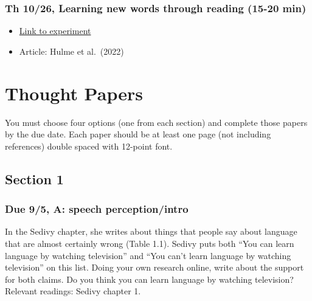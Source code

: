 \documentclass[
  letterpaper,
  DIV=11,
  numbers=noendperiod]{scrreprt}
\providecommand{\tightlist}{%
  \setlength{\itemsep}{0pt}\setlength{\parskip}{0pt}}\usepackage{longtable,booktabs,array}
\begin{document}
\hypertarget{th-1026-learning-new-words-through-reading-15-20-min}{%
\subsection*{Th 10/26, Learning new words through reading (15-20
min)}\label{th-1026-learning-new-words-through-reading-15-20-min}}

\begin{itemize}
\tightlist
\item
  \href{https://research.sc/participant/login/dynamic/B3E7A61D-6F92-4B3A-B80A-8D8513D01C6B}{Link
  to experiment}
\item
  Article: Hulme et al.~(2022)
\end{itemize}

\hypertarget{thought-papers}{%
\chapter*{Thought Papers}\label{thought-papers}}


You must choose four options (one from each section) and complete those
papers by the due date. Each paper should be at least one page (not
including references) double spaced with 12-point font.

\hypertarget{section-1}{%
\section*{Section 1}\label{section-1}}


\hypertarget{due-95-a-speech-perceptionintro}{%
\subsection*{Due 9/5, A: speech
perception/intro}\label{due-95-a-speech-perceptionintro}}

In the Sedivy chapter, she writes about things that people say about
language that are almost certainly wrong (Table 1.1). Sedivy puts both
``You can learn language by watching television'' and ``You can't learn
language by watching television'' on this list. Doing your own research
online, write about the support for both claims. Do you think you can
learn language by watching television? Relevant readings: Sedivy chapter
1.
\end{document}
